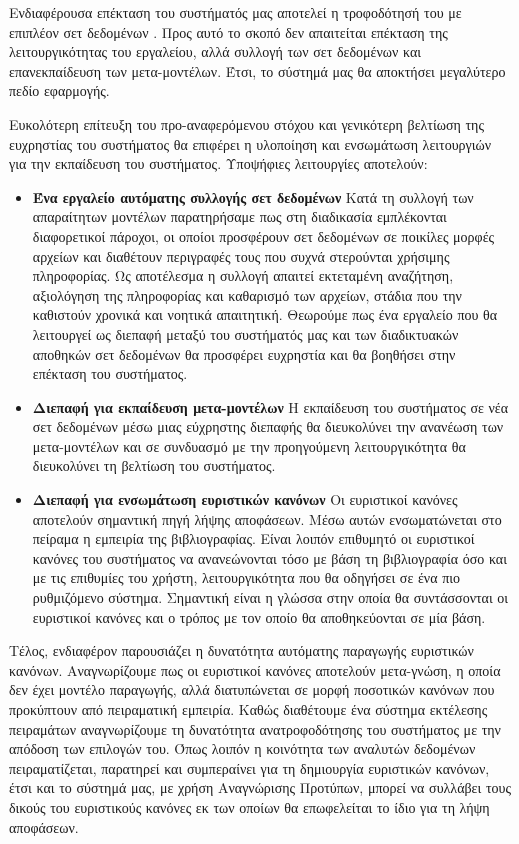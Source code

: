 Ενδιαφέρουσα επέκταση του συστήματός μας αποτελεί η τροφοδότησή του με επιπλέον σετ δεδομένων . Προς αυτό το σκοπό δεν απαιτείται επέκταση της λειτουργικότητας του εργαλείου, αλλά συλλογή των σετ δεδομένων και επανεκπαίδευση των μετα-μοντέλων. Έτσι, το σύστημά μας θα αποκτήσει μεγαλύτερο πεδίο εφαρμογής.

Ευκολότερη επίτευξη του προ-αναφερόμενου στόχου και γενικότερη βελτίωση της ευχρηστίας του συστήματος θα επιφέρει η υλοποίηση και ενσωμάτωση λειτουργιών για την εκπαίδευση του συστήματος. Υποψήφιες λειτουργίες αποτελούν:
\begin{itemize}
	\item \textbf{Ένα εργαλείο αυτόματης συλλογής σετ δεδομένων} Κατά τη συλλογή των απαραίτητων μοντέλων παρατηρήσαμε πως στη διαδικασία εμπλέκονται διαφορετικοί πάροχοι, οι οποίοι προσφέρουν σετ δεδομένων σε ποικίλες μορφές αρχείων και διαθέτουν περιγραφές τους που συχνά στερούνται χρήσιμης πληροφορίας. Ως αποτέλεσμα η συλλογή απαιτεί εκτεταμένη αναζήτηση, αξιολόγηση της πληροφορίας και καθαρισμό των αρχείων, στάδια που την καθιστούν χρονικά και νοητικά απαιτητική. Θεωρούμε πως ένα εργαλείο που θα λειτουργεί ως διεπαφή μεταξύ του συστήματός μας και των διαδικτυακών αποθηκών σετ δεδομένων θα προσφέρει ευχρηστία και θα βοηθήσει στην επέκταση του συστήματος.
	\item \textbf{Διεπαφή για εκπαίδευση μετα-μοντέλων} Η εκπαίδευση του συστήματος σε νέα σετ δεδομένων μέσω μιας εύχρηστης διεπαφής θα διευκολύνει την ανανέωση των μετα-μοντέλων και σε συνδυασμό με την προηγούμενη λειτουργικότητα θα διευκολύνει τη βελτίωση του συστήματος.
	\item \textbf{Διεπαφή για ενσωμάτωση ευριστικών κανόνων} Οι ευριστικοί κανόνες αποτελούν σημαντική πηγή λήψης αποφάσεων. Μέσω αυτών ενσωματώνεται στο πείραμα η εμπειρία της βιβλιογραφίας. Είναι λοιπόν επιθυμητό οι ευριστικοί κανόνες του συστήματος να ανανεώνονται τόσο με βάση τη βιβλιογραφία όσο και με τις επιθυμίες του χρήστη, λειτουργικότητα που θα οδηγήσει σε ένα πιο ρυθμιζόμενο σύστημα. Σημαντική είναι η γλώσσα στην οποία θα συντάσσονται οι ευριστικοί κανόνες και ο τρόπος με τον οποίο θα αποθηκεύονται σε μία βάση. 
\end{itemize}

Τέλος, ενδιαφέρον παρουσιάζει η δυνατότητα αυτόματης παραγωγής ευριστικών κανόνων. Αναγνωρίζουμε πως οι ευριστικοί κανόνες αποτελούν μετα-γνώση, η οποία δεν έχει μοντέλο παραγωγής, αλλά διατυπώνεται σε μορφή ποσοτικών κανόνων που προκύπτουν από πειραματική εμπειρία. Καθώς διαθέτουμε ένα σύστημα εκτέλεσης πειραμάτων αναγνωρίζουμε τη δυνατότητα ανατροφοδότησης του συστήματος με την απόδοση των επιλογών του. Όπως λοιπόν η κοινότητα των αναλυτών δεδομένων πειραματίζεται, παρατηρεί και συμπεραίνει για τη δημιουργία ευριστικών κανόνων, έτσι και το σύστημά μας, με χρήση Αναγνώρισης Προτύπων, μπορεί να συλλάβει τους δικούς του ευριστικούς κανόνες εκ των οποίων θα επωφελείται το ίδιο για τη λήψη αποφάσεων. 
